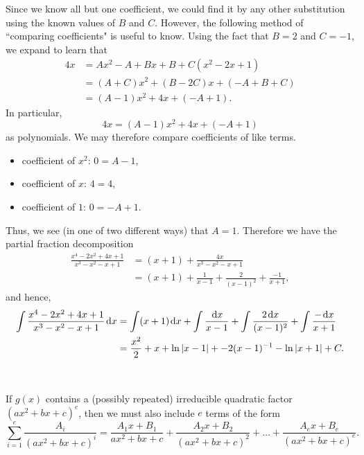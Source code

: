 {\begin{enumerate}
Since we know all but one coefficient, we could find it by any other substitution using the known values of $B$ and $C$.
However, the following method of ``comparing coefficients" is useful to know.
Using the fact that $B=2$ and $C=-1$, we expand to learn that
\begin{align*}
4x &= Ax^2 - A + Bx + B + C(x^2-2x+1) \\
&= (A+C)x^2 + (B-2C)x + (-A + B + C) \\
&= (A-1)x^2 + 4x + (-A+1). 
\end{align*}
In particular,
\begin{equation*}
4x = (A-1)x^2+4x+(-A+1)
\end{equation*}
as polynomials.
We may therefore compare coefficients of like terms.
\begin{itemize}
\item coefficient of $x^2$: $0 = A-1$,
\item coefficient of $x$:   $4 = 4$,
\item coefficient of $1$:	 $0= -A+1$.
\end{itemize}
Thus, we see (in one of two different ways) that $A=1$.
Therefore we have the partial fraction decomposition
\begin{align*}
\frac{x^4-2x^2+4x+1}{x^3-x^2-x+1} 
&= (x+1) + \frac{4x}{x^3-x^2-x+1} \\
&= (x+1) + \frac{1}{x-1} + \frac{2}{(x-1)^2} + \frac{-1}{x+1}, 
\end{align*}
and hence,
\begin{align*}
\int \frac{x^4-2x^2+4x+1}{x^3-x^2-x+1} \mkern 2mu \mathrm{d} x 
&= \int(x+1) \mkern 2mu \mathrm{d} x + \int\frac{\mkern 2mu \mathrm{d} x}{x-1} + \int\frac{2\mkern 2mu \mathrm{d} x}{(x-1)^2} + \int\frac{-\mkern 2mu \mathrm{d} x}{x+1} \\
&= \frac{x^2}{2} + x + \ln{|x-1|} + -2(x-1)^{-1} - \ln{|x+1|} + C.
\end{align*}
\end{enumerate}
}
\newpage
\else
\newpage
\,
\newpage
\fi


\begin{remark}
If $g(x)$ contains a (possibly repeated) irreducible quadratic factor $(ax^2+bx+c)^e$, then we must also include $e$ terms of the form
\begin{equation*}
\sum_{i=1}^e\frac{A_{i}}{(ax^2+bx+c)^i} = \frac{A_{1}x+B_1}{ax^2+bx+c} + \frac{A_{2}x+B_2}{(ax^2+bx+c)^2}+\dots +\frac{A_{e}x+B_e}{(ax^2+bx+c)^e}.
\end{equation*}
\end{remark}

